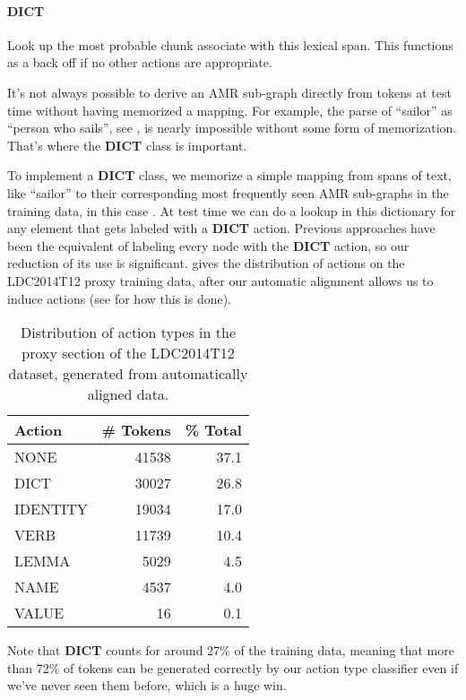 \documentclass[11pt]{article}
\begin{document}
\paragraph{DICT} Look up the most probable chunk associate with this lexical span. This functions as a back off if no other actions are appropriate.


It's not always possible to derive an AMR sub-graph directly from tokens at test time without having memorized a mapping. For example, the parse of ``sailor'' as ``person who sails'', see , is nearly impossible without some form of memorization. That's where the \textbf{DICT} class is important.

To implement a \textbf{DICT} class, we memorize a simple mapping from spans of text, like ``sailor'' to their corresponding most frequently seen AMR sub-graphs in the training data, in this case . At test time we can do a lookup in this dictionary for any element that gets labeled with a \textbf{DICT} action. Previous approaches have been the equivalent of labeling every node with the \textbf{DICT} action, so our reduction of its use is significant.  gives the distribution of actions on the LDC2014T12 proxy training data, after our automatic alignment allows us to induce actions (see  for how this is done).

\begin{table}[h]
\begin{center}
\begin{tabular}{|l|rr|}
\hline \bf Action & \bf \# Tokens & \bf \% Total \\ \hline
NONE & 41538 & 37.1\\
DICT & 30027 & 26.8 \\
IDENTITY & 19034 & 17.0 \\
VERB & 11739 & 10.4 \\
LEMMA & 5029 & 4.5 \\
NAME & 4537 & 4.0 \\
VALUE & 16  & 0.1\\
\hline
\end{tabular}
\end{center}
\caption{\label{tab:distro} Distribution of action types in the proxy section of the LDC2014T12 dataset, generated from automatically aligned data. }
\end{table}

Note that \textbf{DICT} counts for around 27\% of the training data, meaning that more than 72\% of tokens can be generated correctly by our action type classifier even if we've never seen them before, which is a huge win.
\end{document}
